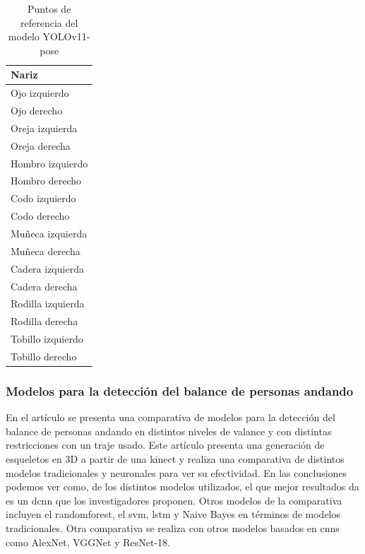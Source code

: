 \begin{table}[H]
    \centering
    \caption{Puntos de referencia del modelo YOLOv11-pose}
    \label{tab:pose-yolo}
    \begin{tabular}{|l|}
        \hline
        Nariz             \\
        \hline
        Ojo izquierdo     \\
        \hline
        Ojo derecho       \\
        \hline
        Oreja izquierda   \\
        \hline
        Oreja derecha     \\
        \hline
        Hombro izquierdo  \\
        \hline
        Hombro derecho    \\
        \hline
        Codo izquierdo    \\
        \hline
        Codo derecho      \\
        \hline
        Muñeca izquierda  \\
        \hline
        Muñeca derecha    \\
        \hline
        Cadera izquierda  \\
        \hline
        Cadera derecha    \\
        \hline
        Rodilla izquierda \\
        \hline
        Rodilla derecha   \\
        \hline
        Tobillo izquierdo \\
        \hline
        Tobillo derecho   \\
        \hline
    \end{tabular}
\end{table}

\subsubsection{Modelos para la detección del balance de personas andando}

En el artículo \cite{combining3dskeleton} se presenta una comparativa de modelos para la detección del balance de personas andando en distintos niveles de valance y con distintas restricciones con un traje usado. Este artículo presenta una generación de esqueletos en 3D a partir de una kinect y realiza una comparativa de distintos modelos tradicionales y neuronales para ver su efectividad. En las conclusiones podemos ver como, de los distintos modelos utilizados, el que mejor resultados da es un \gls{dcnn} que los investigadores proponen. Otros modelos de la comparativa incluyen el \gls{randomforest}, el \gls{svm}, \gls{lstm} y Naive Bayes en términos de modelos tradicionales. Otra comparativa se realiza con otros modelos basados en \glspl{cnn} como AlexNet, VGGNet y ResNet-18.

